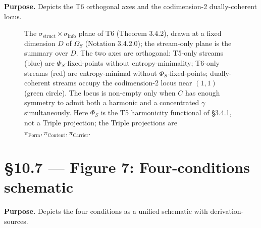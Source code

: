 \documentclass[11pt, openany]{book}
\newcommand{\sectionbreak}{\clearpage}
\begin{document}
\textbf{Purpose.} Depicts the T6 orthogonal axes and the codimension-2 dually-coherent locus.

\begin{figure}[htbp]
\centering
{}
\caption{The $\sigma_\mathrm{struct} \times \sigma_\mathrm{info}$ plane of T6 (Theorem 3.4.2), drawn at a fixed dimension $D$ of $\Omega_S$ (Notation 3.4.2.0); the stream-only plane is the summary over $D$. The two axes are orthogonal: T5-only streams (blue) are $\Phi_S$-fixed-points without entropy-minimality; T6-only streams (red) are entropy-minimal without $\Phi_S$-fixed-points; dually-coherent streams occupy the codimension-2 locus near $(1, 1)$ (green circle). The locus is non-empty only when $C$ has enough symmetry to admit both a harmonic and a concentrated $\gamma$ simultaneously. Here $\Phi_S$ is the T5 harmonicity functional of §3.4.1, not a Triple projection; the Triple projections are $\pi_\mathrm{Form}, \pi_\mathrm{Content}, \pi_\mathrm{Carrier}$.}
\label{fig:dual-coherence-axes}
\end{figure}

\sectionbreak

\section{§10.7 --- Figure 7: Four-conditions schematic}

\textbf{Purpose.} Depicts the four conditions as a unified schematic with derivation-sources.
\end{document}
